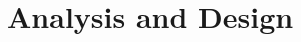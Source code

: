 \section{Analysis and Design}
\begin{comment}
If your project involves designing a system, give a
good high-level overview of your design.\\ \newline \noindent In many projects, the final design is different from
that originally envisaged. If the differences are
interesting, write about them, and why the changes
were made. Discoveries during the project may have changed the direction of work, or invalidated prior
work, in which case you get credit for the design
process, if it is principled, as well as the end product.\\ \newline \noindent If your design was not implemented fully, describe
which parts you did implement, and which you didn't.
If the reason you didn't implement everything is
interesting (eg it turned out to be difficult for
unexpected reasons), write about it.\\ \newline \noindent Note that the Project Report is written at the end of
project work and must describe the project work, but
need not do this chronologically. Often the best
description of design, in retrospect, is far from the
way in which you developed it. Where the evolution
of ideas is interesting or relevant it can be described,
as above, but otherwise the order in which things
were done need not be documented.\\ \newline \noindent The Examiners are just as interested in the
engineering process you went through in performing
your project work as the results you finally produced.
So make sure your report identifies when design
choices have to be made, what were the possibilities,
and why you made the particular choices and
decisions that you did. They are looking for principled
rational arguments and for critical assessment.
Engineering involves trade-offs and the reasons for a
design decision may be various, and may in some
cases be out of your control. Explicit understanding of
this, and the ability to communicate it, is important.
\end{comment}

